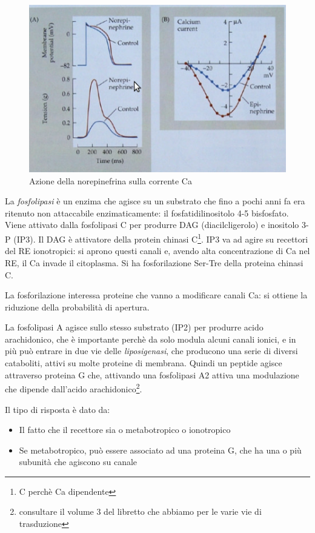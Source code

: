 \documentclass[a4paper,12pt]{article}
\begin{document}
\begin{figure}[H]
\centering
\includegraphics[scale=0.4]{immagine/n.jpg}
\caption{Azione della norepinefrina sulla corrente Ca}
\end{figure}

La \emph{fosfolipasi} è un enzima che agisce su un substrato che fino a pochi anni fa era ritenuto non attaccabile enzimaticamente: il fosfatidilinositolo 4-5 bisfosfato. Viene attivato dalla fosfolipasi C per produrre DAG (diacilcligerolo) e inositolo 3-P (IP3). Il DAG è attivatore della protein chinasi C\footnote{C perchè Ca dipendente}. IP3 va ad agire su recettori del RE ionotropici: si aprono questi canali e, avendo alta concentrazione di Ca nel RE, il Ca invade il citoplasma.
Si ha fosforilazione Ser-Tre della proteina chinasi C. 

La fosforilazione interessa proteine che vanno a modificare canali Ca: si ottiene la riduzione della probabilità di apertura.

La fosfolipasi A agisce sullo stesso substrato (IP2) per produrre acido arachidonico, che è importante perchè da solo modula alcuni canali ionici, e in più può entrare in due vie delle \emph{liposigenasi}, che producono una serie di diversi cataboliti, attivi su molte proteine di membrana. Quindi un peptide agisce attraverso proteina G che, attivando una fosfolipasi A2 attiva una modulazione che dipende dall'acido arachidonico\footnote{consultare il volume 3 del libretto che abbiamo per le varie vie di trasduzione}.

Il tipo di risposta è dato da:
\begin{itemize}
\item{Il fatto che il recettore sia o metabotropico o ionotropico}
\item{Se metabotropico, può essere associato ad una proteina G, che ha una o più subunità che agiscono su canale}
\end{itemize}
\end{document}
